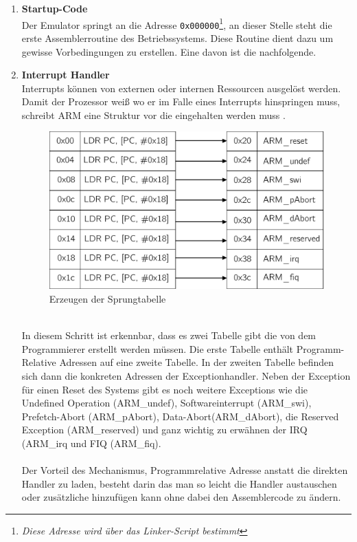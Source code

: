 	\begin{enumerate}
		\item{\textbf{Startup-Code}}\\
		 Der Emulator springt an die Adresse \texttt{0x000000}\footnote{\textit{Diese Adresse wird \"uber das Linker-Script bestimmt}}, an dieser Stelle steht die erste Assemblerroutine des Betriebssystems. Diese Routine dient dazu um gewisse Vorbedingungen zu erstellen. Eine davon ist die nachfolgende.
		 \item{\textbf{Interrupt Handler}}\\
		 \label{draft:exceptionHandler}
Interrupts k\"onnen von externen oder internen Ressourcen ausgel\"ost werden. Damit der Prozessor wei{\ss} wo er im Falle eines Interrupts hinspringen muss, schreibt ARM eine Struktur vor die eingehalten werden muss \parencite[vgl.][54]{archManI}. 
			\begin{figure}[h]
				\centering
					\includegraphics[scale=0.6]{common/exceptionhandler.pdf}
				\caption{Erzeugen der Sprungtabelle}
				\label{draft:excptionTable}
			\end{figure}\\
			In diesem Schritt ist erkennbar, dass es zwei Tabelle gibt die von dem Programmierer erstellt werden m\"ussen. Die erste Tabelle enth\"alt Programm-Relative Adressen auf eine zweite Tabelle. In der zweiten Tabelle befinden sich dann die konkreten Adressen der Exceptionhandler. Neben der Exception f\"ur einen Reset des Systems gibt es noch weitere Exceptions wie die Undefined Operation (ARM\_undef), Softwareinterrupt (ARM\_swi), Prefetch-Abort (ARM\_pAbort), Data-Abort(ARM\_dAbort),  die Reserved Exception (ARM\_reserved) und ganz wichtig zu erw\"ahnen der IRQ (ARM\_irq und FIQ (ARM\_fiq).\\\\
Der Vorteil des Mechanismus, Programmrelative Adresse anstatt die direkten Handler zu laden, besteht darin das man so leicht die Handler austauschen oder zus\"atzliche hinzuf\"ugen kann ohne dabei den Assemblercode zu \"andern.\\

\end{enumerate}
